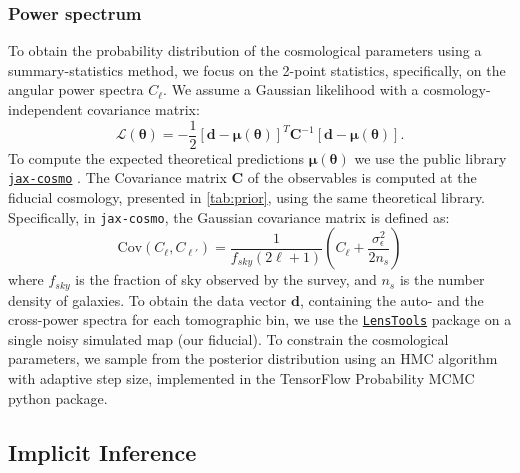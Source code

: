 \documentclass{aa}
\begin{document}
\subsubsection{Power spectrum}
To obtain the probability distribution of the cosmological parameters using a summary-statistics method, we focus on the 2-point statistics, specifically, on the angular power spectra $C_{\ell}$.
We assume a Gaussian likelihood with a cosmology-independent covariance matrix:
\begin{equation}
    \mathcal{L}(\bm{\theta})=-\frac{1}{2}[\bm{d}-\bm{\mu}(\bm{\theta})]^{T}\bm{C}^{-1}[\bm{d}-\bm{\mu}(\bm{\theta})].
\end{equation}
To compute the expected theoretical predictions $\bm{\mu}(\bm{\theta})$ we use the public library \href{https://github.com/DifferentiableUniverseInitiative/jax_cosmo}{\texttt{jax-cosmo}} \citep{Campagne_2023}. 
 The Covariance matrix $\bm{C}$ of the observables is computed at the fiducial cosmology, presented in \autoref{tab:prior}, using the same theoretical library. Specifically, in {\texttt{jax-cosmo}}, the Gaussian covariance matrix is defined as:
\begin{equation}
    \text{Cov}(C_{\ell},C_{\ell'})=\frac{1}{f_{sky}(2 \ell+1)}\left(C_{\ell}+\frac{\sigma_{\epsilon}^2}{2n_s}\right)
\end{equation}
where $f_{sky}$ is the fraction of sky observed by the survey, and $n_s$ is the number density of galaxies. 
To obtain the data vector $\bm{d}$, containing the auto- and the cross-power spectra for each tomographic bin, we use the \href{https://lenstools.readthedocs.io/en/latest/lenstool} {\texttt{LensTools}} package \citep{2016A&C....17...73P} on a single noisy simulated map (our fiducial). 
To constrain the cosmological parameters, we sample from the posterior distribution using an HMC algorithm with adaptive step size, implemented in the TensorFlow Probability MCMC python package.
\subsection{Implicit Inference}
\end{document}
